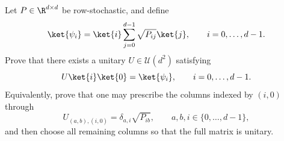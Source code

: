 Let $P\in\R^{d\times d}$ be row-stochastic, and define
$$
    \ket{\psi_i}=\ket{i}\sum_{j=0}^{d-1}\sqrt{P_{ij}}\ket{j},
    \qquad i=0,\dots,d-1.
$$
Prove that there exists a unitary $U\in\mathcal U(d^2)$ satisfying
$$
    U\ket{i}\ket{0}=\ket{\psi_i},
    \qquad i=0,\dots,d-1.
$$
Equivalently, prove that one may prescribe the columns indexed by $(i,0)$ through
$$
    U_{(a,b),(i,0)}=\delta_{a,i}\sqrt{P_{ib}},
    \qquad a,b,i\in\{0,\dots,d-1\},
$$
and then choose all remaining columns so that the full matrix is unitary.
